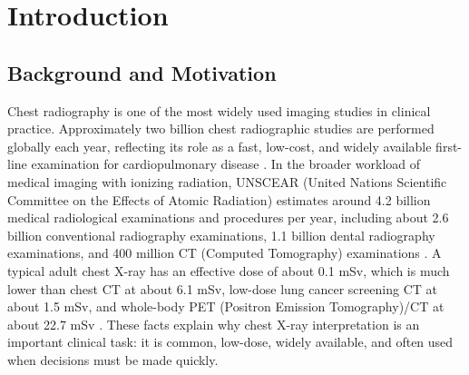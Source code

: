 \section{Introduction}\label{sec}

\subsection{Background and Motivation}\label{subsec}

Chest radiography is one of the most widely used imaging studies in clinical practice. Approximately two billion chest radiographic studies are performed globally each year, reflecting its role as a fast, low-cost, and widely available first-line examination for cardiopulmonary disease \cite{abbott2025challenging_cxr}. In the broader workload of medical imaging with ionizing radiation, UNSCEAR (United Nations Scientific Committee on the Effects of Atomic Radiation) estimates around 4.2 billion medical radiological examinations and procedures per year, including about 2.6 billion conventional radiography examinations, 1.1 billion dental radiography examinations, and 400 million CT (Computed Tomography) examinations \cite{unscear2021medical_exposure}. A typical adult chest X-ray has an effective dose of about 0.1 mSv, which is much lower than chest CT at about 6.1 mSv, low-dose lung cancer screening CT at about 1.5 mSv, and whole-body PET (Positron Emission Tomography)/CT at about 22.7 mSv \cite{radiologyinfo2025radiation_dose}. These facts explain why chest X-ray interpretation is an important clinical task: it is common, low-dose, widely available, and often used when decisions must be made quickly.

